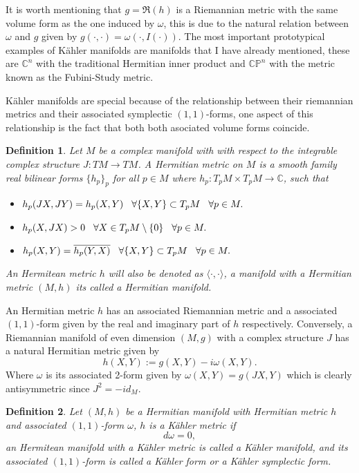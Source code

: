 \documentclass[12pt,twoside,a4paper]{report}
\newtheorem{definition}{Definition}[section]
\newcommand{\co}{\ensuremath{\mathbb C }}
\newcommand{\con}{\ensuremath{\mathbb{C}^n}}
\newcommand{\cp}{\ensuremath{\mathbb{CP}}}
\begin{document}
It is worth mentioning that $g=\Re (h)$ is a Riemannian metric with the same volume form as the one induced by $\omega$, this is due to the natural relation between $\omega$ and $g$ given by $g(\cdot,\cdot)=\omega(\cdot,I(\cdot))$. The most important prototypical examples of K\"ahler manifolds are manifolds that I have already mentioned, these are $\con$ with the traditional Hermitian inner product and $\cp^{n}$ with the metric known as the Fubini-Study metric.

Kähler manifolds are special because of the relationship between their riemannian metrics and their associated symplectic $(1,1)$-forms, one aspect of this relationship is the fact that both both asociated volume forms coincide.
\begin{definition}
        Let $M$ be a complex manifold with with respect to the integrable complex structure
        $J:TM\rightarrow TM$. A \textit{Hermitian metric} on $M$ is a smooth family
        real bilinear forms $\lbrace h_p\rbrace_p$ for all $p\in M$ where
        $h_p:T_pM\times T_pM\rightarrow\co$, such that
\begin{itemize}
        \item $h_p(JX,JY)=h_p(X,Y)\hspace{0.3cm}\forall\lbrace X,Y\rbrace\subset T_pM\hspace{0.3cm}\forall p\in M.$
        \item $h_p(X,JX)>0\hspace{0.3cm}\forall X\in T_p M\setminus\lbrace 0\rbrace\hspace{0.3cm}\forall p\in M.$
        \item $h_p(X,Y)=\overline{h_p(Y,X)}\hspace{0.3cm}\forall\lbrace X,Y\rbrace\subset T_pM\hspace{0.3cm}\forall p\in M.$
\end{itemize}
An Hermitean metric $h$ will also be denoted as $\langle\cdot,\cdot\rangle$, a manifold with a Hermitian metric $(M,h)$ its called a \textit{Hermitian manifold}.
\end{definition}
An Hermitian metric $h$ has an associated Riemannian metric and a associated $(1,1)$-form given by the real and
imaginary part of $h$ respectively. Conversely, a Riemannian manifold of even dimension $(M,g)$ with a complex structure $J$ has
a natural Hermitian metric given by
\[
  h(X,Y):=g(X,Y)-i\omega(X,Y).
\]
\noindent Where $\omega$ is its associated 2-form given by $\omega(X,Y)=g(JX,Y)$ which is clearly antisymmetric since $J^2=-id_M$.
\begin{definition}
        Let $(M,h)$ be a Hermitian manifold with Hermitian metric $h$ and associated $(1,1)$-form $\omega$, $h$ is a Kähler metric if
        \[
          d\omega=0,
        \]
        \noindent an Hermitean manifold with a Kähler metric is called a \textit{Kähler manifold}, and its associated $(1,1)$-form is  called a \textit{Kähler form} or a \textit{Kähler symplectic form}.
\end{definition}
\end{document}
